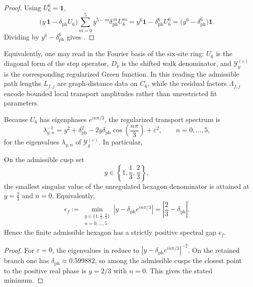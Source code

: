 \begin{proof}
Using $U_6^6=\mathbf 1$,
\[
\bigl(y\,\mathbf 1-\delta_{\mathrm{ph}}U_6\bigr)
\sum_{m=0}^{5}y^{5-m}\delta_{\mathrm{ph}}^{\,m}U_6^m
=
y^6\mathbf 1-\delta_{\mathrm{ph}}^6U_6^6
=
\bigl(y^6-\delta_{\mathrm{ph}}^6\bigr)\mathbf 1.
\]
Dividing by $y^6-\delta_{\mathrm{ph}}^6$ gives .
\end{proof}

Equivalently, one may read  in the Fourier basis of the six-site ring: $U_6$ is the diagonal form of the step operator, $D_y$ is the shifted walk denominator, and $\mathcal Y_y^{(\varepsilon)}$ is the corresponding regularized Green function. In this reading the admissible path lengths $L_{f,j}$ are graph-distance data on $C_6$, while the residual factors $\Lambda_{f,j}$ encode bounded local transport amplitudes rather than unrestricted fit parameters.

Because $U_6$ has eigenphases $e^{in\pi/3}$, the regularized transport spectrum is
\begin{equation}
\label{eq:transport-spectrum}
\lambda_{y,n}^{-1}
=
y^2+\delta_{\mathrm{ph}}^2-2y\delta_{\mathrm{ph}}\cos\!\left(\frac{n\pi}{3}\right)+\varepsilon^2,
\qquad
n=0,\dots,5,
\end{equation}
for the eigenvalues $\lambda_{y,n}$ of $\mathcal Y_y^{(\varepsilon)}$. In particular,
\begin{lemma}
\label{lem:finite-admissible-hexagon-gap}
On the admissible cusp set
\[
y\in\left\{1,\frac13,\frac23\right\},
\]
the smallest singular value of the unregulated hexagon denominator is attained at $y=\frac23$ and $n=0$. Equivalently,
\[
\epsilon_f
:=
\min_{\substack{y\in\{1,\frac13,\frac23\}\\ n=0,\dots,5}}
\left|y-\delta_{\mathrm{ph}}e^{in\pi/3}\right|
=
\left|\frac23-\delta_{\mathrm{ph}}\right|.
\]
Hence the finite admissible hexagon has a strictly positive spectral gap $\epsilon_f$.
\end{lemma}

\begin{proof}
For $\varepsilon=0$, the eigenvalues in  reduce to $|y-\delta_{\mathrm{ph}}e^{in\pi/3}|^{-2}$. On the retained branch one has $\delta_{\mathrm{ph}}\approx \num{0.599882}$, so among the admissible cusps the closest point to the positive real phase is $y=2/3$ with $n=0$. This gives the stated minimum.
\end{proof}

